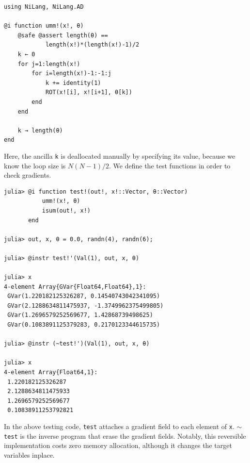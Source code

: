 \documentclass[aps,twocolumn,longbibliography,english,superscriptaddress]{revtex4-1}
\newcommand{\<}{\langle}
\renewcommand{\>}{\rangle}
\newcommand{\Tr}{{\rm Tr}}
\theoremstyle{definition}\newtheorem{definition}{\textit{Definition}}
\begin{document}
\begin{minipage}{.44\textwidth}
\begin{lstlisting}[mathescape=true]
using NiLang, NiLang.AD

@i function umm!(x!, θ)
    @safe @assert length(θ) == 
            length(x!)*(length(x!)-1)/2
    k ← 0
    for j=1:length(x!)
        for i=length(x!)-1:-1:j
            k += identity(1)
            ROT(x![i], x![i+1], θ[k])
        end
    end

    k → length(θ)
end
\end{lstlisting}
\end{minipage}

Here, the ancilla \texttt{k} is deallocated manually by specifying its value, because we know the loop size is $N(N-1)/2$.
We define the test functions in order to check gradients.

\begin{minipage}{.44\textwidth}
\begin{lstlisting}[mathescape=true]
julia> @i function test!(out!, x!::Vector, θ::Vector)
           umm!(x!, θ)
           isum(out!, x!)
       end

julia> out, x, θ = 0.0, randn(4), randn(6);

julia> @instr test!'(Val(1), out, x, θ)

julia> x
4-element Array{GVar{Float64,Float64},1}:
 GVar(1.220182125326287, 0.14540743042341095) 
 GVar(2.1288634811475937, -1.3749962375499805)
 GVar(1.2696579252569677, 1.42868739498625)   
 GVar(0.1083891125379283, 0.2170123344615735) 

julia> @instr (~test!')(Val(1), out, x, θ)

julia> x
4-element Array{Float64,1}:
 1.220182125326287  
 2.1288634811475933 
 1.2696579252569677 
 0.10838911253792821
\end{lstlisting}
\end{minipage}

In the above testing code, \texttt{test\textquotesingle} attaches a gradient field to each element of \texttt{x}. \texttt{$\sim$test\textquotesingle} is the inverse program that erase the gradient fields.
Notably, this reversible implementation costs zero memory allocation, although it changes the target variables inplace.

\end{document}
